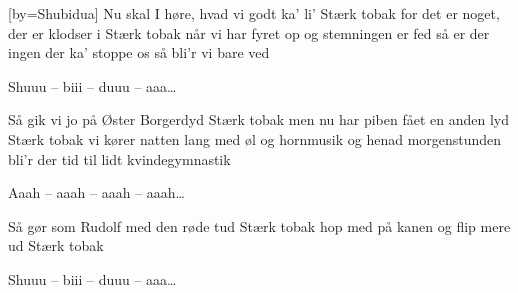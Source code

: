 [by={Shubidua}]
\beginverse
Nu skal I høre, hvad vi godt ka' li'
Stærk tobak
for det er noget, der er klodser i
Stærk tobak
når vi har fyret op 
og stemningen er fed 
så er der ingen der ka' stoppe os
så bli'r vi bare ved
\endverse

\beginchorus
Shuuu -- biii -- duuu -- aaa\dots
\endchorus

\beginverse
Så gik vi jo på Øster Borgerdyd
Stærk tobak
men nu har piben fået en anden lyd
Stærk tobak
vi kører natten lang 
med øl og hornmusik 
og henad morgenstunden bli'r der tid
til lidt kvindegymnastik
\endverse

\beginchorus
Aaah -- aaah -- aaah -- aaah\dots
\endchorus

\beginverse
Så gør som Rudolf med den røde tud
Stærk tobak
hop med på kanen og flip mere ud
Stærk tobak
\endverse

\beginchorus
Shuuu -- biii -- duuu -- aaa\dots 
\endchorus
\endsong
